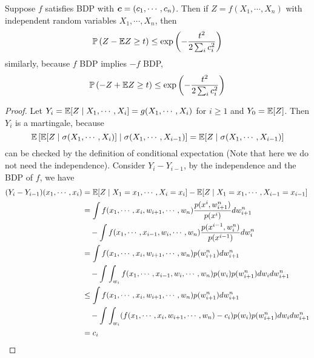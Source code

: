 \begin{enumerate}[label=\arabic{*}.]
	\begin{lem}
	    Suppose $f$ satisfies BDP with $\boldsymbol{c} = (c_1,\cdots,c_n)$. Then if $Z = f(X_1,\cdots,X_n)$ with independent random variables $X_1,\cdots,X_n$, then
	    \begin{equation*}
	    	\mathbb{P}\left(Z - \mathbb{E} Z \geq t\right) \leq \exp\left(-\frac{t^2}{2 \sum_i c_i^2}\right)
	    \end{equation*}
	    similarly, because $f$ BDP implies $-f$ BDP, 
	    \begin{equation*}
	        \mathbb{P}\left(-Z + \mathbb{E} Z \geq t\right) \leq \exp\left(-\frac{t^2}{2 \sum_i c_i^2}\right)
	    \end{equation*}
	\end{lem}
	\begin{proof}
	    Let $Y_i = \mathbb{E}[Z \mid X_1,\cdots, X_i] = g(X_1,\cdots,X_i)$ for $i \geq 1$ and $Y_0 = \mathbb{E}[Z]$. Then $Y_i$ is a martingale, because
	    \begin{equation*}
	    	\mathbb{E}\left[ \mathbb{E}[Z \mid \sigma(X_1,\cdots, X_i)] \mid \sigma(X_1,\cdots, X_{i-1})\right] = \mathbb{E}[Z \mid \sigma(X_1,\cdots, X_{i-1})]
	    \end{equation*}
	    can be checked by the definition of conditional expectation (Note that here we do not need the independence). Consider $Y_i - Y_{i-1}$, by the independence and the BDP of $f$, we have
	    \begin{equation*}
	    	\begin{aligned}
	    		(Y_i - Y_{i-1})(x_1,\cdots,x_i) &= \mathbb{E}[Z \mid X_1=x_1,\cdots, X_i=x_i] - \mathbb{E}[Z \mid X_1=x_1,\cdots, X_{i-1}=x_{i-1}] \\
	    		&= \int f(x_1,\cdots, x_i, w_{i+1},\cdots,w_{n})\frac{p(x^i,w_{i+1}^n)}{p(x^i)} dw_{i+1}^n \\
	    		&\quad- \int f(x_1,\cdots, x_{i-1}, w_{i},\cdots,w_{n})\frac{p(x^{i-1},w_{i}^n)}{p(x^{i-1})} dw_{i}^n \\
	    		&= \int f(x_1,\cdots, x_i, w_{i+1},\cdots,w_{n})p(w_{i+1}^n) dw_{i+1}^n \\
	    		&\quad- \int \int_{w_i}f(x_1,\cdots, x_{i-1}, w_{i},\cdots,w_{n})p(w_i)p(w_{i+1}^n) dw_idw_{i+1}^n \\
	    		&\leq \int f(x_1,\cdots, x_i, w_{i+1},\cdots,w_{n})p(w_{i+1}^n) dw_{i+1}^n \\
	    		&\quad- \int \int_{w_i}(f(x_1,\cdots, x_{i}, w_{i+1},\cdots,w_{n})-c_i)p(w_i)p(w_{i+1}^n) dw_idw_{i+1}^n \\
	    		&= c_i
	    	\end{aligned}
	    \end{equation*}

\end{proof}
\end{enumerate}
